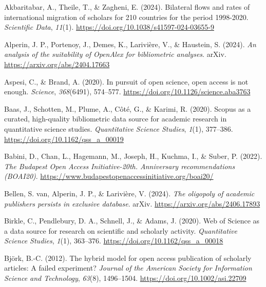 \documentclass[a4paper,man,floatsintext,longtable,noextraspace,10pt]{apa6}
\newlength{\cslhangindent}
\newenvironment{CSLReferences}[2] %
{\begin{list}{}{%
  \setlength{\itemindent}{0pt}
  \setlength{\leftmargin}{0pt}
  \setlength{\parsep}{0pt}
  \ifodd #1
  \setlength{\leftmargin}{\cslhangindent}
  \setlength{\itemindent}{-1\cslhangindent}
  \fi
  \setlength{\itemsep}{#2\baselineskip}}}
{\end{list}}
\begin{document}
\label{refs}
\begin{CSLReferences}{1}{0}
Akbaritabar, A., Theile, T., \& Zagheni, E. (2024). Bilateral flows and
rates of international migration of scholars for 210 countries for the
period 1998-2020. \emph{Scientific Data}, \emph{11}(1).
\url{https://doi.org/10.1038/s41597-024-03655-9}

Alperin, J. P., Portenoy, J., Demes, K., Larivière, V., \& Haustein, S.
(2024). \emph{An analysis of the suitability of OpenAlex for
bibliometric analyses}. arXiv. \url{https://arxiv.org/abs/2404.17663}

Aspesi, C., \& Brand, A. (2020). In pursuit of open science, open access
is not enough. \emph{Science}, \emph{368}(6491), 574--577.
\url{https://doi.org/10.1126/science.aba3763}

Baas, J., Schotten, M., Plume, A., Côté, G., \& Karimi, R. (2020).
Scopus as a curated, high-quality bibliometric data source for academic
research in quantitative science studies. \emph{Quantitative Science
Studies}, \emph{1}(1), 377--386.
\url{https://doi.org/10.1162/qss_a_00019}

Babini, D., Chan, L., Hagemann, M., Joseph, H., Kuchma, I., \& Suber, P.
(2022). \emph{{The Budapest Open Access Initiative-20th. Anniversary
recommendations (BOAI20)}}.
\url{https://www.budapestopenaccessinitiative.org/boai20/}

Bellen, S. van, Alperin, J. P., \& Larivière, V. (2024). \emph{The
oligopoly of academic publishers persists in exclusive database}. arXiv.
\url{https://arxiv.org/abs/2406.17893}

Birkle, C., Pendlebury, D. A., Schnell, J., \& Adams, J. (2020). {Web of
Science} as a data source for research on scientific and scholarly
activity. \emph{Quantitative Science Studies}, \emph{1}(1), 363--376.
\url{https://doi.org/10.1162/qss_a_00018}

Björk, B.-C. (2012). The hybrid model for open access publication of
scholarly articles: A failed experiment? \emph{Journal of the American
Society for Information Science and Technology}, \emph{63}(8),
1496--1504. \url{https://doi.org/10.1002/asi.22709}


\end{CSLReferences}
\end{document}
